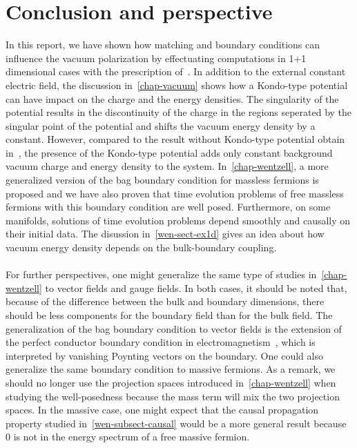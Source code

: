 \chapter{Conclusion and perspective}
In this report, we have shown how matching and boundary conditions can influence the vacuum polarization by effectuating computations in 1+1 dimensional cases with the prescription of~\cite{Zahn2015}. 
In addition to the external constant electric field,
the discussion in~\cref{chap-vacuum} shows how a Kondo-type potential can have impact on the charge and the energy densities.
The singularity of the potential results in the discontinuity of the charge in the regions seperated by the singular point of the potential and shifts the vacuum energy density by a constant.
However, compared to the result without Kondo-type potential obtain in~\cite{Zahn2015}, the presence of the Kondo-type potential adds only constant background vacuum charge and energy density to the system. 
In~\cref{chap-wentzell}, a more generalized version of the bag boundary condition for massless fermions is proposed and we have also proven that time evolution problems of free massless fermions with this boundary condition are well posed.
Furthermore, on some manifolds, solutions of time evolution problems depend smoothly and causally on their initial data.
The disussion in~\cref{wen-sect-ex1d} gives an idea about how vacuum energy density depends on the bulk-boundary coupling.
\\\\
For further perspectives, 
one might generalize the same type of studies in~\cref{chap-wentzell} to vector fields and gauge fields.
In both cases, it should be noted that, because of the difference between the bulk and boundary dimensions, 
there should be less components for the boundary field than for the bulk field.
The generalization of the bag boundary condition to vector fields is the extension of the perfect conductor boundary condition in electromagnetism~\cite{Stokes2015}, 
which is interpreted by vanishing Poynting vectors on the boundary.
One could also generalize the same boundary condition to massive fermions. 
As a remark, 
we should no longer use the projection spaces introduced in~\cref{chap-wentzell} when studying the well-posedness because the mass term will mix the two projection spaces.
In the massive case, one might expect that the causal propagation property studied in~\cref{wen-subsect-causal} would be a more general result because 0 is not in the energy spectrum of a free massive fermion. 




